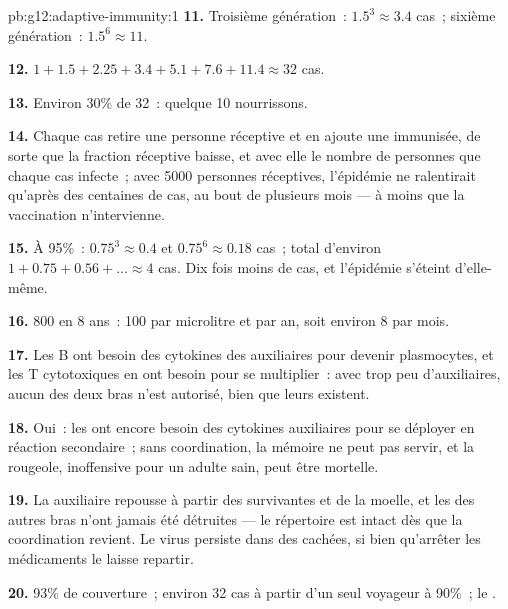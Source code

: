 \begin{solution}{pb:g12:adaptive-immunity:1}
\textbf{11.} Troisième génération~: $1.5^3 \approx 3.4$ cas~; sixième
génération~: $1.5^6 \approx 11$.

\textbf{12.} $1 + 1.5 + 2.25 + 3.4 + 5.1 + 7.6 + 11.4 \approx 32$ cas.

\textbf{13.} Environ 30\% de 32~: quelque 10 nourrissons.

\textbf{14.} Chaque cas retire une personne réceptive et en ajoute une
immunisée, de sorte que la fraction réceptive baisse, et avec elle le
nombre de personnes que chaque cas infecte~; avec 5000 personnes
réceptives, l'épidémie ne ralentirait qu'après des centaines de cas,
au bout de plusieurs mois --- à moins que la vaccination n'intervienne.

\textbf{15.} À 95\%~: $0.75^3 \approx 0.4$ et $0.75^6 \approx 0.18$
cas~; total d'environ $1 + 0.75 + 0.56 + \dots \approx 4$ cas. Dix
fois moins de cas, et l'épidémie s'éteint d'elle-même.

\textbf{16.} 800 en 8 ans~: 100 par microlitre et par an, soit environ
8 par mois.

\textbf{17.} Les  B ont besoin des cytokines des 
auxiliaires pour devenir plasmocytes, et les  T
cytotoxiques en ont besoin pour se multiplier~: avec trop peu
d'auxiliaires, aucun des deux bras n'est autorisé, bien que leurs
 existent.

\textbf{18.} Oui~: les  ont encore besoin des
cytokines auxiliaires pour se déployer en réaction secondaire~; sans
coordination, la mémoire ne peut pas servir, et la rougeole,
inoffensive pour un adulte sain, peut être mortelle.

\textbf{19.} La  auxiliaire repousse à partir des 
survivantes et de la moelle, et les  des autres bras
n'ont jamais été détruites --- le répertoire est intact dès que la
coordination revient. Le virus persiste dans des  cachées, si
bien qu'arrêter les médicaments le laisse repartir.

\textbf{20.} 93\% de couverture~; environ 32 cas à partir d'un seul
voyageur à 90\%~; le .
\end{solution}
